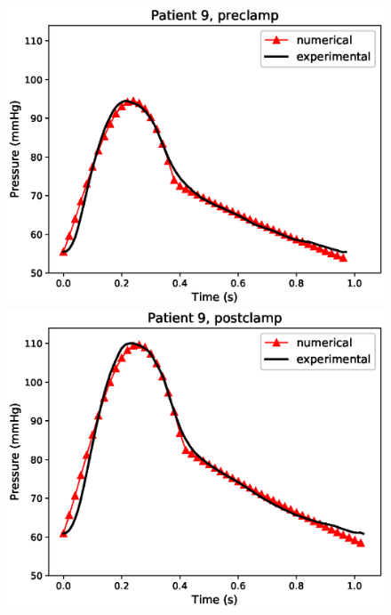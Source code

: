 \documentclass{config}
\begin{document}
\begin{figure}[H]
\begin{minipage}{0.48\textwidth}
\includegraphics[scale=0.5]{Figures/9preclamp.eps}
\end{minipage}
\begin{minipage}{0.48\textwidth}
\includegraphics[scale=0.5]{Figures/9postclamp.eps}
\end{minipage}


\end{figure}
\end{document}

